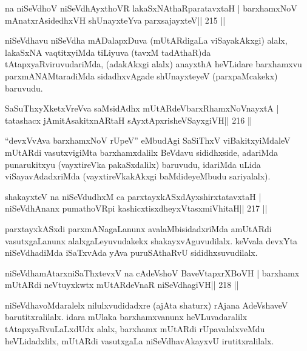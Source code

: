 
\begin{shl}
na niSeVdhoV niSeVdhAyxthoVR lakaSxNAthaRparatavxtaH |
barxhamxNoV mAnatxrAsidedhxVH shUnayxteYva parxsajayxteV\hfill || 215 ||
\end{shl}

\begin{artha}
niSeVdhavu niSeVdha mADalapxDuva (mUtARdigaLa viSayakAkxgi) alalx, lakaSxNA vaqtitxyiMda tiLiyuva (tavxM tadAthaR)da tAtapxyaRviruvudariMda, (adakAkxgi alalx) anayxthA heVLidare barxhamxvu parxmANAMtaradiMda sidadhxvAgade shUnayxteyeV (parxpaMcakekx) baruvudu.
\end{artha}

\begin{shl}
SaSuThxyXketxVreVva saMsidAdhx mUtARdeVbarxRhamxNoV\s nayxtA |
tatashacx jAmitAsakitxnARtaH sAyxtApxrisheVSayxgiVH\hfill || 216 ||
\end{shl}

\begin{artha}
``devxVvAva barxhamxNoV rUpeV'' eMbudAgi SaSiThxV viBakitxyiMdaleV
  mUtARdi vasutxvigiMta barxhamxdalilx BeVdavu sididhxside, adariMda
  punarukitxyu (vayxtireVka pakaSxdalilx) baruvudu, idariMda uLida
  viSayavAdadxriMda (vayxtireVkakAkxgi baMdideyeMbudu sariyalalx). 
\end{artha}


\begin{shl}
shakayxteV na niSeVdudhxM ca parxtayxkASxdAyxshirxtatavxtaH |
niSeVdhAnanx pumathoVR\s pi kashicxtisxdheyxVtasxmiVhitaH\hfill || 217 ||
\end{shl}

\begin{artha}
parxtayxkASxdi parxmANagaLanunx avalaMbisidadxriMda
amUtARdi vasutxgaLanunx alalxgaLeyuvudakekx shakayxvAguvudilalx.
keVvala devxYta niSeVdhadiMda iSaTxvAda yAva puruSAthaRvU
sididhxsuvudilalx.
\end{artha}

\begin{shl}
niSeVdhamAtarxniSaThxtevxV na cA\s\s deVshoV BaveVtapxrXBoVH |
barxhamx mUtARdi neVtuyxkwtx mUtARdeVnaR niSeVdhagiVH\hfill || 218 ||
\end{shl}

\begin{artha}
niSeVdhavoMdaralelx nilulxvudidadxre (ajAta shaturx) rAjana AdeVshaveV barutitxralilalx. idara mUlaka barxhamxvanunx heVLuvadaralilx tAtapxyaRvuLaLxdUdx alalx, barxhamx mUtARdi rUpavalalxveMdu heVLidadxlilx, mUtARdi vasutxgaLa niSeVdhavAkayxvU irutitxralilalx.
\end{artha}

